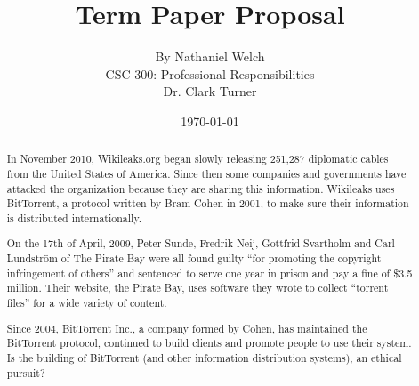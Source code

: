 \documentclass[11pt]{article}
\begin{document}
\title{\vfill Term Paper Proposal} %
\author{
By Nathaniel Welch\vspace{10pt}\\
CSC 300: Professional Responsibilities\vspace{10pt}\\
Dr. Clark Turner\vspace{10pt}\\
}
\date{\today}

\maketitle

\vfill %
\begin{abstract}



In November 2010, Wikileaks.org began slowly releasing 251,287 diplomatic cables from the United States of America. \cite{cablegate} Since then some companies and governments have attacked the organization because they are sharing this information. Wikileaks uses BitTorrent, a protocol written by Bram Cohen in 2001, to make sure their information is distributed internationally.

On the 17th of April, 2009, Peter Sunde, Fredrik Neij, Gottfrid Svartholm and Carl Lundström of The Pirate Bay were all found guilty ``for promoting the copyright infringement of others'' and sentenced to serve one year in prison and pay a fine of \$3.5 million. \cite{tpbverdict} Their website, the Pirate Bay, uses software they wrote to collect ``torrent files'' for a wide variety of content.

Since 2004, BitTorrent Inc., a company formed by Cohen, has maintained the BitTorrent protocol, continued to build clients and promote people to use their system. Is the building of BitTorrent (and other information distribution systems), an ethical pursuit?

\end{abstract}

\thispagestyle{empty} %
\newpage
\end{document}
